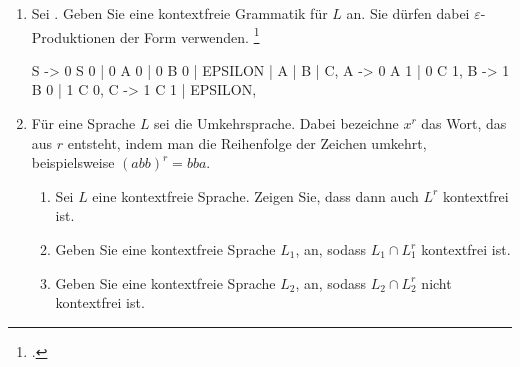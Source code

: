 \documentclass{bschlangaul-aufgabe}
\begin{document}

\begin{enumerate}


\item Sei . Geben Sie eine kontextfreie Grammatik für $L$
an. Sie dürfen dabei $\varepsilon$-Produktionen der Form
 verwenden.
\footcite{examen:66115:2020:09}

\begin{bAntwort}
\begin{liProduktionsRegeln}
S -> 0 S 0 | 0 A 0 | 0 B 0 | EPSILON | A | B | C,
A -> 0 A 1 | 0 C 1,
B -> 1 B 0 | 1 C 0,
C -> 1 C 1 | EPSILON,
\end{liProduktionsRegeln}
\end{bAntwort}


\item Für eine Sprache $L$ sei  die
Umkehrsprache. Dabei bezeichne $x^r$ das Wort, das aus $r$ entsteht,
indem man die Reihenfolge der Zeichen umkehrt, beispielsweise $(abb)^r =
bba$.

\begin{enumerate}


\item Sei $L$ eine kontextfreie Sprache. Zeigen Sie, dass dann auch
$L^r$ kontextfrei ist.


\item Geben Sie eine kontextfreie Sprache $L_1$, an, sodass $L_1 \cap
L^r_1$ kontextfrei ist.


\item Geben Sie eine kontextfreie Sprache $L_2$, an, sodass $L_2 \cap
L^r_2$ nicht kontextfrei ist.

\end{enumerate}
\end{enumerate}
\end{document}
